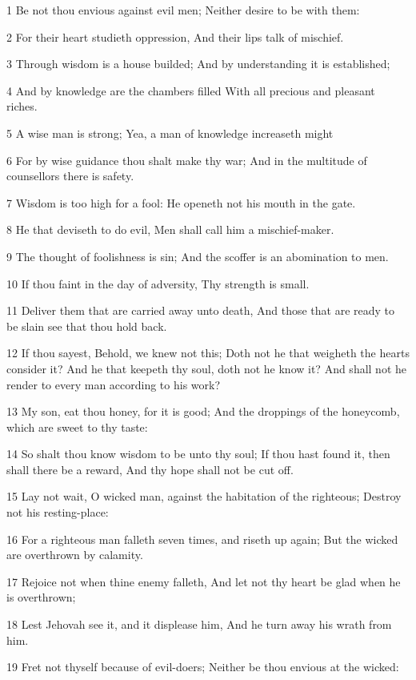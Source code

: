 \par 1 Be not thou envious against evil men; Neither desire to be with them:
\par 2 For their heart studieth oppression, And their lips talk of mischief.
\par 3 Through wisdom is a house builded; And by understanding it is established;
\par 4 And by knowledge are the chambers filled With all precious and pleasant riches.
\par 5 A wise man is strong; Yea, a man of knowledge increaseth might
\par 6 For by wise guidance thou shalt make thy war; And in the multitude of counsellors there is safety.
\par 7 Wisdom is too high for a fool: He openeth not his mouth in the gate.
\par 8 He that deviseth to do evil, Men shall call him a mischief-maker.
\par 9 The thought of foolishness is sin; And the scoffer is an abomination to men.
\par 10 If thou faint in the day of adversity, Thy strength is small.
\par 11 Deliver them that are carried away unto death, And those that are ready to be slain see that thou hold back.
\par 12 If thou sayest, Behold, we knew not this; Doth not he that weigheth the hearts consider it? And he that keepeth thy soul, doth not he know it? And shall not he render to every man according to his work?
\par 13 My son, eat thou honey, for it is good; And the droppings of the honeycomb, which are sweet to thy taste:
\par 14 So shalt thou know wisdom to be unto thy soul; If thou hast found it, then shall there be a reward, And thy hope shall not be cut off.
\par 15 Lay not wait, O wicked man, against the habitation of the righteous; Destroy not his resting-place:
\par 16 For a righteous man falleth seven times, and riseth up again; But the wicked are overthrown by calamity.
\par 17 Rejoice not when thine enemy falleth, And let not thy heart be glad when he is overthrown;
\par 18 Lest Jehovah see it, and it displease him, And he turn away his wrath from him.
\par 19 Fret not thyself because of evil-doers; Neither be thou envious at the wicked:
